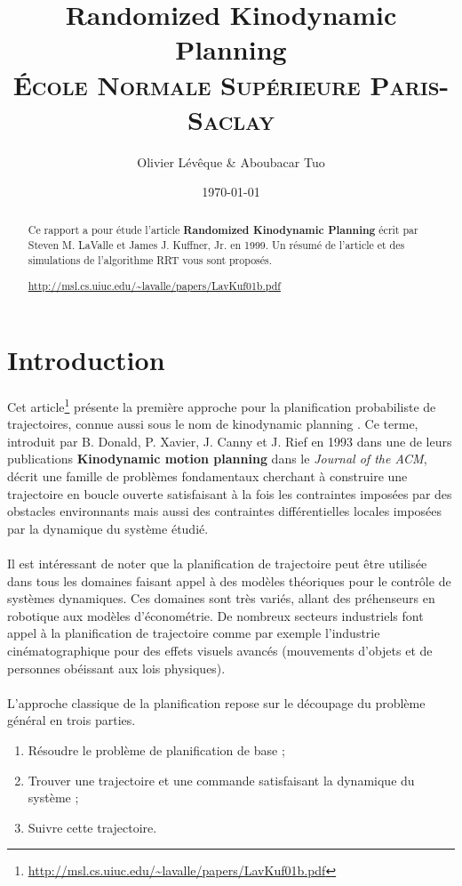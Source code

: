 \documentclass[12pt]{article}
\title{Randomized Kinodynamic Planning\\
\textsc{\small École Normale Supérieure Paris-Saclay}}
\author{Olivier Lévêque \& Aboubacar Tuo}
\date{\today}
\begin{document}
\maketitle

\begin{abstract}
Ce rapport a pour étude l'article \textbf{Randomized Kinodynamic Planning} écrit par Steven M. LaValle et James J. Kuffner, Jr. en 1999. Un résumé de l'article et des simulations de l'algorithme RRT vous sont proposés.
\begin{center}
\url{http://msl.cs.uiuc.edu/~lavalle/papers/LavKuf01b.pdf}
\end{center}
\end{abstract}

\section{Introduction}

\paragraph{}
Cet article\footnote{\url{http://msl.cs.uiuc.edu/~lavalle/papers/LavKuf01b.pdf}} présente la première approche pour la planification probabiliste de trajectoires, connue aussi sous le nom de \og kinodynamic planning \fg{}. Ce terme, introduit par B. Donald, P. Xavier, J. Canny et J. Rief en 1993 dans une de leurs publications \textbf{Kinodynamic motion planning} dans le \textit{Journal of the ACM}, décrit une famille de problèmes fondamentaux cherchant à construire une trajectoire en boucle ouverte satisfaisant à la fois les contraintes imposées par des obstacles environnants mais aussi des contraintes différentielles locales imposées par la dynamique du système étudié.

\paragraph{}
Il est intéressant de noter que la planification de trajectoire peut être utilisée dans tous les domaines faisant appel à des modèles théoriques pour le contrôle de systèmes dynamiques. Ces domaines sont très variés, allant des préhenseurs en robotique aux modèles d'économétrie. De nombreux secteurs industriels font appel à la planification de trajectoire comme par exemple l'industrie cinématographique pour des effets visuels avancés (mouvements d'objets et de personnes obéissant aux lois physiques).

\paragraph{}
L'approche classique de la planification repose sur le découpage du problème général en trois parties.
\begin{enumerate}
\item	Résoudre le problème de planification de base ;
\item	Trouver une trajectoire et une commande satisfaisant la dynamique du système ;
\item	Suivre cette trajectoire.
\end{enumerate}
\end{document}
